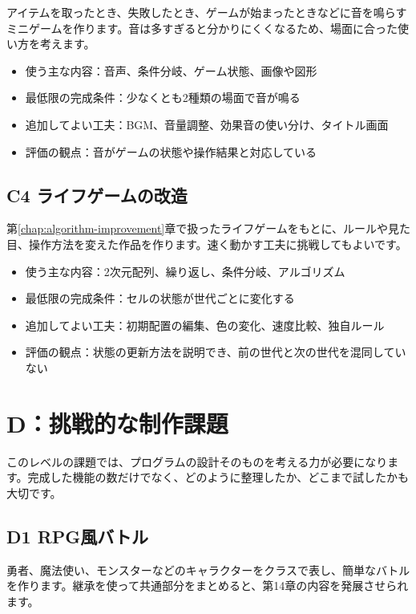 アイテムを取ったとき、失敗したとき、ゲームが始まったときなどに音を鳴らすミニゲームを作ります。音は多すぎると分かりにくくなるため、場面に合った使い方を考えます。

\begin{itemize}
    \item 使う主な内容：音声、条件分岐、ゲーム状態、画像や図形
    \item 最低限の完成条件：少なくとも2種類の場面で音が鳴る
    \item 追加してよい工夫：BGM、音量調整、効果音の使い分け、タイトル画面
    \item 評価の観点：音がゲームの状態や操作結果と対応している
\end{itemize}

\subsection{C4 ライフゲームの改造}

第\ref{chap:algorithm-improvement}章で扱ったライフゲームをもとに、ルールや見た目、操作方法を変えた作品を作ります。速く動かす工夫に挑戦してもよいです。

\begin{itemize}
    \item 使う主な内容：2次元配列、繰り返し、条件分岐、アルゴリズム
    \item 最低限の完成条件：セルの状態が世代ごとに変化する
    \item 追加してよい工夫：初期配置の編集、色の変化、速度比較、独自ルール
    \item 評価の観点：状態の更新方法を説明でき、前の世代と次の世代を混同していない
\end{itemize}

\section{D：挑戦的な制作課題}

このレベルの課題では、プログラムの設計そのものを考える力が必要になります。完成した機能の数だけでなく、どのように整理したか、どこまで試したかも大切です。

\subsection{D1 RPG風バトル}

勇者、魔法使い、モンスターなどのキャラクターをクラスで表し、簡単なバトルを作ります。継承を使って共通部分をまとめると、第14章の内容を発展させられます。

